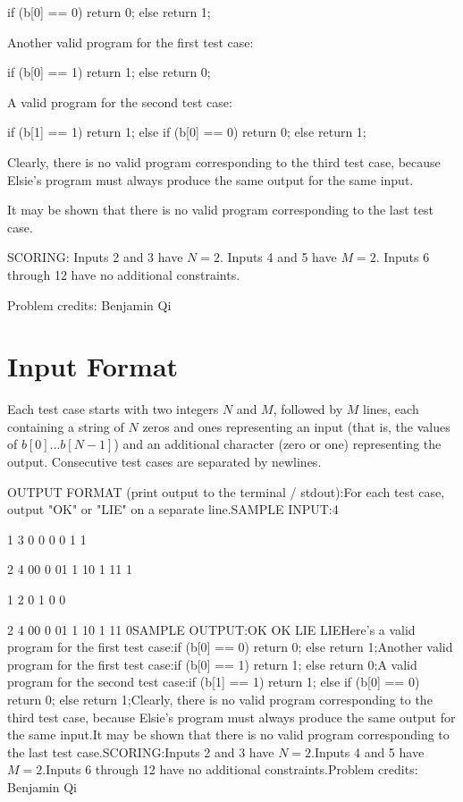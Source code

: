 \documentclass[12pt]{article}
\begin{document}
if (b[0] == 0) return 0;
else return 1;

Another valid program for the first test case:


if (b[0] == 1) return 1;
else return 0;

A valid program for the second test case:


if (b[1] == 1) return 1;
else if (b[0] == 0) return 0;
else return 1;

Clearly, there is no valid program corresponding to the third test case, because
Elsie's program must always produce the same output for the same input.

It may be shown that there is no valid program corresponding to the last test
case.

SCORING:
Inputs 2 and 3 have $N = 2$. Inputs 4 and 5 have $M = 2$. Inputs 6 through 12 have no additional constraints. 


Problem credits: Benjamin Qi



\section*{Input Format}
Each test case starts with two integers $N$ and $M$, followed by $M$ lines, each
containing a string of $N$ zeros and ones representing an input (that is, the
values of $b[0] \ldots b[N-1]$) and an additional character (zero or one)
representing the output. Consecutive test cases are separated by newlines.

OUTPUT FORMAT (print output to the terminal / stdout):For each test case, output "OK" or "LIE" on a separate line.SAMPLE INPUT:4

1 3
0 0
0 0
1 1

2 4
00 0
01 1
10 1
11 1

1 2
0 1
0 0

2 4
00 0
01 1
10 1
11 0SAMPLE OUTPUT:OK
OK
LIE
LIEHere's a valid program for the first test case:if (b[0] == 0) return 0;
else return 1;Another valid program for the first test case:if (b[0] == 1) return 1;
else return 0;A valid program for the second test case:if (b[1] == 1) return 1;
else if (b[0] == 0) return 0;
else return 1;Clearly, there is no valid program corresponding to the third test case, because
Elsie's program must always produce the same output for the same input.It may be shown that there is no valid program corresponding to the last test
case.SCORING:Inputs 2 and 3 have $N = 2$.Inputs 4 and 5 have $M = 2$.Inputs 6 through 12 have no additional constraints.Problem credits: Benjamin Qi
\end{document}
